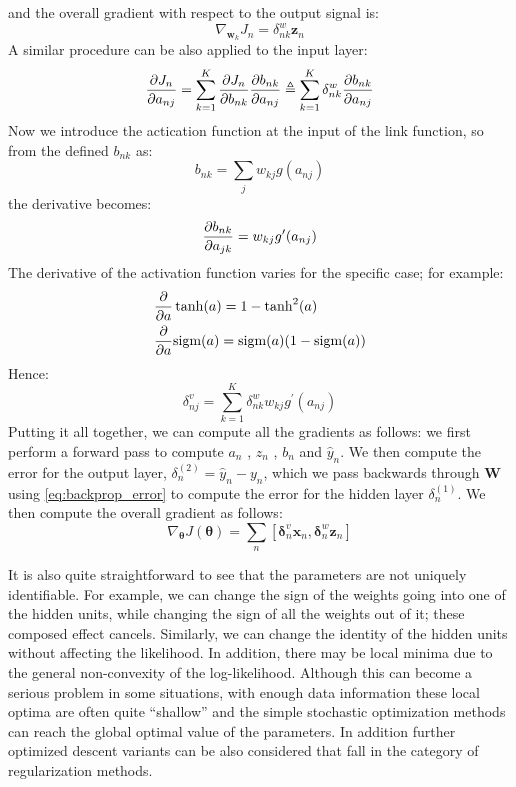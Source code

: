 and the overall gradient with respect to the output signal is:
\begin{equation}
    \nabla_{\bm{w}_k} J_n = \delta_{nk}^w \bm{z}_n
\end{equation}
A similar procedure can be also applied to the input layer:
\begin{equation}
    \pdv{J_n}{a_{nj}} = \sum_{k=1}^K \pdv{J_n}{b_{nk}}\pdv{b_{nk}}{a_{nj}} 
    \triangleq \sum_{k=1}^K \delta_{nk}^w \pdv{b_{nk}}{a_{nj}}
\end{equation}
Now we introduce the actication function at the input of the link function, so from the defined $b_{nk}$ as:
\begin{equation}
    b_{nk} = \sum_j w_{kj} g( a_{nj} )
\end{equation}
the derivative becomes:
\begin{equation}
    \pdv{b_{nk}}{a_{jk}} = w_{kj} g^\prime(a_{nj})
\end{equation}
The derivative of the activation function varies for the specific case; for example:
\begin{align*}
    & \pdv{}{a} \tanh(a) = 1-\tanh^2(a) \\
    & \pdv{}{a} \text{sigm}(a) = \text{sigm}(a)(1-\text{sigm}(a))
\end{align*}
Hence:
\begin{equation}
    \delta_{nj}^v = \sum_{k=1}^K \delta_{nk}^w w_{kj} g^{\prime}(a_{nj})
    \label{eq:backprop_error}
\end{equation}
Putting it all together, we can compute all the gradients as follows: we first perform a forward pass to compute $a_n$ , $z_n$ , $b_n$ and $\hat{y}_n$. We then compute the error for the output layer, $\delta_n^{(2)} = \hat{y}_n - y_n$, which we pass backwards through $\bm{W}$ using \eqref{eq:backprop_error} to compute the error for the hidden layer $\delta_n^{(1)}$. We then compute the overall gradient as follows:
\begin{equation}
    \nabla_{\bm{\theta}} J(\bm{\theta}) = \sum_n \left[ \bm{\delta}_n^v \bm{x}_n, \bm{\delta}_n^w \bm{z}_n \right]
\end{equation}

It is also quite straightforward to see that the parameters are not uniquely identifiable. For example, we can change the sign of the weights going into one of the hidden units, while changing the sign of all the weights out of it; these composed effect cancels. Similarly, we can change the identity of the hidden units without affecting the likelihood. 
In addition, there may be local minima due to the general non-convexity of the log-likelihood. Although this can become a serious problem in some situations, with enough data information these local optima are often quite “shallow” and the simple stochastic optimization methods can reach the global optimal value of the parameters. In addition further optimized descent variants can be also considered that fall in the category of regularization methods. 

